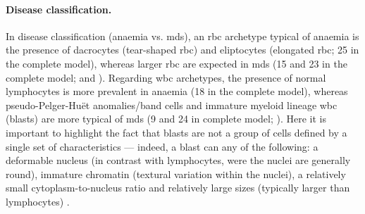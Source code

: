 \paragraph{Disease classification.} In disease classification (anaemia vs. \ac{mds}), an \ac{rbc} archetype typical of anaemia is the presence of dacrocytes (tear-shaped \ac{rbc}) and eliptocytes (elongated \ac{rbc}; 25 in the complete model), whereas larger \ac{rbc} are expected in \ac{mds} (15 and 23 in the complete model;  and ). Regarding \ac{wbc} archetypes, the presence of normal lymphocytes is more prevalent in anaemia (18 in the complete model), whereas pseudo-Pelger-Huët anomalies/band cells and immature myeloid lineage \ac{wbc} (blasts) are more typical of \ac{mds} (9 and 24 in complete model; ). Here it is important to highlight the fact that blasts are not a group of cells defined by a single set of characteristics --- indeed, a blast can any of the following: a deformable nucleus (in contrast with lymphocytes, were the nuclei are generally round), immature chromatin (textural variation within the nuclei), a relatively small cytoplasm-to-nucleus ratio and relatively large sizes (typically larger than lymphocytes) \cite{Bain2004-uq,Bain2005-zg,Bain2014-oc}.

\begin{figure}[!ht]
    \label{fig:mile-vice-vcq-so-disease-classification}
\end{figure}

\begin{figure}[!ht]
    \label{fig:rbc-disease-classification-examples}
\end{figure}

